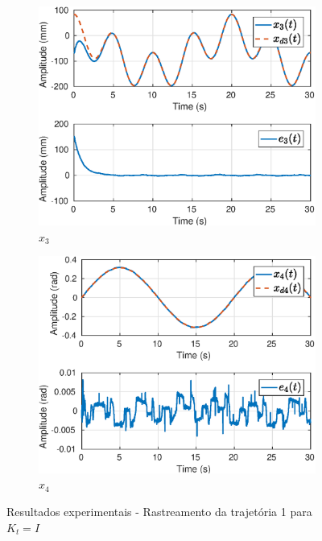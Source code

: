 \begin{figure}[H]
\begin{subfigure}{.5\textwidth}
  \includegraphics[width=\linewidth]{./img/traj_1_k1/x3.eps}
  \caption{$x_3$}
  \label{fig:sub1}
\end{subfigure}%
\begin{subfigure}{.5\textwidth}
  \centering
  \includegraphics[width=\linewidth]{./img/traj_1_k1/x4.eps}
  \caption{$x_4$}
  \label{fig:sub2}
\end{subfigure}
\caption{Resultados experimentais - Rastreamento da trajetória 1 para ${K}_t = {I}$}
\label{fig:test}
\end{figure}


